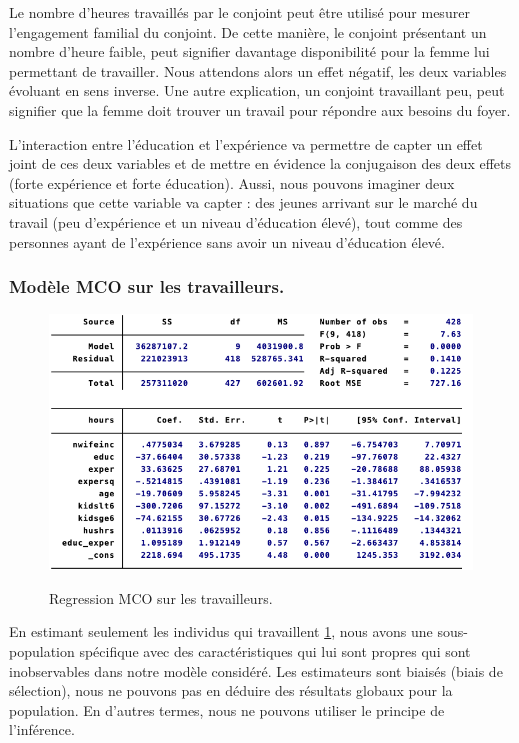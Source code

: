 Le nombre d’heures travaillés par le conjoint peut être utilisé pour mesurer l’engagement familial du conjoint. De cette manière, le conjoint présentant un nombre d’heure faible, peut signifier davantage disponibilité pour la femme lui permettant de travailler. Nous attendons alors un effet négatif, les deux variables évoluant en sens inverse. Une autre explication, un conjoint travaillant peu, peut signifier que la femme doit trouver un travail pour répondre aux besoins du foyer. 

\vspace*{0.3cm}

L’interaction entre l’éducation et l’expérience va permettre de capter un effet joint de ces deux variables et de mettre en évidence la conjugaison des deux effets (forte expérience et forte éducation). Aussi, nous pouvons imaginer deux situations que cette variable va capter : des jeunes arrivant sur le marché du travail (peu d’expérience et un niveau d’éducation élevé), tout comme des personnes ayant de l’expérience sans avoir un niveau d’éducation élevé.

\subsubsection{Modèle MCO sur les travailleurs.}

\begin{figure}[h]
    \caption{Regression MCO sur les travailleurs.}
    \includegraphics[scale = 0.8]{100_tab_results/MCOsurlestravailleurs.png}
    \centering
    \label{reg:MCOtravailleurs}
\end{figure}


En estimant seulement les individus qui travaillent \ref{reg:MCOtravailleurs}, nous avons une sous-population spécifique avec des caractéristiques qui lui sont propres qui sont inobservables dans notre modèle considéré. Les estimateurs sont biaisés (biais de sélection), nous ne pouvons pas en déduire des résultats globaux pour la population. En d’autres termes, nous ne pouvons utiliser le principe de l’inférence. 

